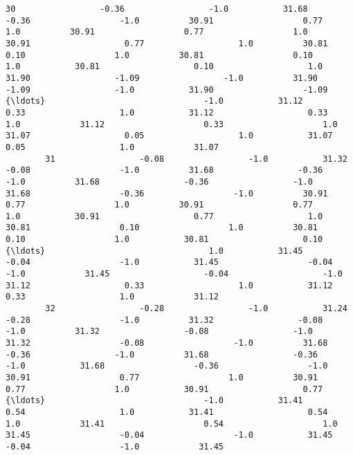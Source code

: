 \documentclass[11pt]{article}
\begin{document}
\begin{Verbatim}[commandchars=\\\{\}]
        30                 -0.36                 -1.0           31.68                  -0.36                  -1.0          30.91                  0.77                  1.0          30.91                  0.77                  1.0           30.91                   0.77                   1.0          30.81                  0.10                  1.0          30.81                  0.10                  1.0           30.81                   0.10                   1.0          31.90                 -1.09                 -1.0          31.90                 -1.09                 -1.0           31.90                  -1.09              {\ldots}                                -1.0           31.12                   0.33                   1.0           31.12                   0.33                   1.0            31.12                    0.33                    1.0           31.07                   0.05                   1.0           31.07                   0.05                   1.0            31.07   
        31                 -0.08                 -1.0           31.32                  -0.08                  -1.0          31.68                 -0.36                 -1.0          31.68                 -0.36                 -1.0           31.68                  -0.36                  -1.0          30.91                  0.77                  1.0          30.91                  0.77                  1.0           30.91                   0.77                   1.0          30.81                  0.10                  1.0          30.81                  0.10                  1.0           30.81                   0.10              {\ldots}                                 1.0           31.45                  -0.04                  -1.0           31.45                  -0.04                  -1.0            31.45                   -0.04                   -1.0           31.12                   0.33                   1.0           31.12                   0.33                   1.0            31.12   
        32                 -0.28                 -1.0           31.24                  -0.28                  -1.0          31.32                 -0.08                 -1.0          31.32                 -0.08                 -1.0           31.32                  -0.08                  -1.0          31.68                 -0.36                 -1.0          31.68                 -0.36                 -1.0           31.68                  -0.36                  -1.0          30.91                  0.77                  1.0          30.91                  0.77                  1.0           30.91                   0.77              {\ldots}                                -1.0           31.41                   0.54                   1.0           31.41                   0.54                   1.0            31.41                    0.54                    1.0           31.45                  -0.04                  -1.0           31.45                  -0.04                  -1.0            31.45   

\end{Verbatim}
\end{document}

